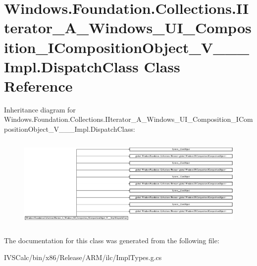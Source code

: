 \hypertarget{class_windows_1_1_foundation_1_1_collections_1_1_i_iterator___a___windows___u_i___composition___585c8f1d78f944d2f2271a4615e40575}{}\section{Windows.\+Foundation.\+Collections.\+I\+Iterator\+\_\+\+A\+\_\+\+Windows\+\_\+\+U\+I\+\_\+\+Composition\+\_\+\+I\+Composition\+Object\+\_\+\+V\+\_\+\+\_\+\+\_\+\+Impl.\+Dispatch\+Class Class Reference}
\label{class_windows_1_1_foundation_1_1_collections_1_1_i_iterator___a___windows___u_i___composition___585c8f1d78f944d2f2271a4615e40575}
Inheritance diagram for Windows.\+Foundation.\+Collections.\+I\+Iterator\+\_\+\+A\+\_\+\+Windows\+\_\+\+U\+I\+\_\+\+Composition\+\_\+\+I\+Composition\+Object\+\_\+\+V\+\_\+\+\_\+\+\_\+\+Impl.\+Dispatch\+Class\+:\begin{figure}[H]
\begin{center}
\leavevmode
\includegraphics[height=4.569733cm]{class_windows_1_1_foundation_1_1_collections_1_1_i_iterator___a___windows___u_i___composition___585c8f1d78f944d2f2271a4615e40575}
\end{center}
\end{figure}


The documentation for this class was generated from the following file\+:\begin{DoxyCompactItemize}
\item 
I\+V\+S\+Calc/bin/x86/\+Release/\+A\+R\+M/ilc/Impl\+Types.\+g.\+cs\end{DoxyCompactItemize}
